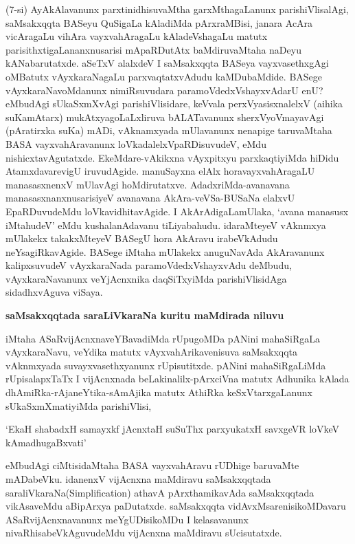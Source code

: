 \noindent
(7-si) AyAkAlavanunx parxtinidhisuvaMtha garxMthagaLanunx parishiVlisalAgi, saMsakxqqta BASeyu QuSigaLa kAladiMda pArxraMBisi, janara AcAra vicAragaLu vihAra vayxva\-hAragaLu kAladeVshagaLu matutx parisithxtigaLa\-nanxnusarisi mApaRDutAtx baMdiru\break\-vaMtaha naDeyu kANabarutatxde. aSeTxV alalxdeV I saMsakxqqta BASeya vayxvasethx\-gAgi oMBatutx vAyxkaraNagaLu parxvaqtatxvAdudu kaMDubaMdide. BASege vAyxkaraNa\-voMdanunx nimiRsu\-vudara paramoVdedxVshayxvAdarU enU? eMbudAgi 
sUkaSxmXvAgi pari\-shiVli\-sidare, keVvala perxVyasisxnalelxV (aihika suKamAtarx) mukAtxyagoLaLxliruva bALATa\-vanunx sherxVyoVmayavAgi (pAratirxka suKa) mADi, vAknamxyada mUlavanunx nena\-pige taruvaMtaha BASA vayxvahAravanunx loVkadalelxVpaRDisuvudeV, eMdu nishicxta\-vAgutatxde. EkeMdare-vAkikxna vAyxpitxyu parxkaqtiyiMda hiDidu AtamxdavarevigU iruvudAgide. manuSayxna elAlx horavayxvahAragaLU manasasxnenxV mUlavAgi hoMdi\-rutatxve. AdadxriMda-avanavana manasasxnanxnusarisiyeV avanavana AkAra-veVSa-\break\-BUSaNa elalxvU EpaRDuvudeMdu loVkavidhitavAgide. I AkArAdigaLa\break mUlaka, `avana manasusx iMtahudeV' eMdu kushalanAdavanu tiLiyabahudu. ida\-raMteyeV vAknmxya mUlakekx takakxMteyeV BASegU hora AkAravu ira\-beVkA\-dudu neYsagiRkavAgide. BASege iMtaha mUlakekx anuguNavAda AkAravanunx kalipxsuvudeV vAyxkaraNada paramoVdedxVshayxvAdu deMbudu, vAyxkaraNavanunx veYjAcnxnika daqSiTxyiMda parishiVlisidAga sidadhxvAguva viSaya.

{\bigskip
\noindent
{\large\bf saMsakxqqtada saraLiVkaraNa kuritu maMdirada niluvu}}\label{page33}
\medskip

\noindent
iMtaha ASaRvijAcnxnaveYBavadiMda rUpugoMDa pANini mahaSiRgaLa vAyxkaraNavu, veYdika matutx vAyxva\-hArikavenisuva saMsakxqqta vAknmxyada suvayxvasethxyanunx rUpisu\-titxde. pANini mahaSiRgaLiMda rUpisa\-lapxTaTx I vijAcnxnada beLakinalilx-pArxciVna matutx Adhunika kAlada dhAmiRka-rAjaneYtika-sAmAjika matutx AthiRka keSxVtarxgaLanunx sUkaSxmXmatiyiMda parishiVlisi,

\begin{shloka}
`EkaH shabadxH samayxkf jAcnxtaH suSuThx parxyukatxH savxgeVR loVkeV kAmadhugaBxvati'\label{35}
\end{shloka}

eMbudAgi ciMtisidaMtaha BASA vayxvahAravu rUDhige baruvaMte mADa\-beVku. idanenxV vijAcnxna maMdiravu saMsakxqqtada saraliVkaraNa{(\rm Simplification)} athavA pArxthamikavAda saMsakxqqtada vikAsaveMdu aBipArxya paDutatxde. saMsakxqqta vidAvxMsarenisikoMDavaru ASaRvijAcnxnavanunx meYgUDisikoMDu I kelasa\-vanunx nivaRhisabeVkAguvudeMdu vijAcnxna maMdiravu sUcisutatxde.

